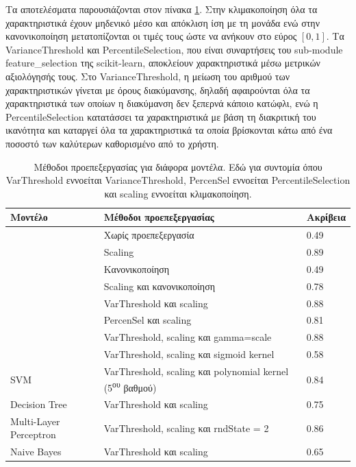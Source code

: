 Τα αποτελέσματα παρουσιάζονται στον πίνακα \ref{table:tab}. Στην κλιμακοποίηση όλα τα χαρακτηριστικά έχουν μηδενικό μέσο και απόκλιση ίση με τη μονάδα ενώ στην κανονικοποίηση μετατοπίζονται οι τιμές τους ώστε να ανήκουν στο εύρος $[0,1]$. Τα VarianceThreshold και PercentileSelection, που είναι συναρτήσεις του sub-module feature\_selection της scikit-learn, αποκλείουν χαρακτηριστικά μέσω μετρικών αξιολόγησής τους. Στο VarianceThreshold, η μείωση του αριθμού των χαρακτηριστικών γίνεται με όρους διακύμανσης, δηλαδή αφαιρούνται όλα τα χαρακτηριστικά των οποίων η διακύμανση δεν ξεπερνά κάποιο κατώφλι, ενώ η PercentileSelection κατατάσσει τα χαρακτηριστικά με βάση τη διακριτική του ικανότητα και καταργεί όλα τα χαρακτηριστικά τα οποία βρίσκονται κάτω από ένα ποσοστό των καλύτερων καθορισμένο από το χρήστη.

\begin{table}[H]
	\centering
	\begin{tabular}{ l l l }
		\textbf{Μοντέλο} & \textbf{Μέθοδοι προεπεξεργασίας} & \textbf{Ακρίβεια} \\ \toprule
		 & Χωρίς προεπεξεργασία & 0.49 \\
		 & Scaling & 0.89 \\
		 & Κανονικοποίηση & 0.49 \\
		 & Scaling και κανονικοποίηση & 0.78 \\
		 & VarThreshold και scaling & 0.88 \\
		 & PercenSel και scaling & 0.81 \\
		 & VarThreshold, scaling και gamma=scale & 0.88 \\
		 & VarThreshold, scaling και sigmoid kernel & 0.58 \\
		\multirow{-9}{*}{SVM} & VarThreshold,  scaling και polynomial kernel (5\textsuperscript{ου} βαθμού) & 0.84 \\ \midrule
		Decision Tree & VarThreshold και scaling & 0.75 \\ \midrule
		Multi-Layer Perceptron & VarThreshold, scaling και rndState = 2 & 0.86 \\ \midrule
		Naive Bayes & VarThreshold και scaling & 0.65 \\ \bottomrule
	\end{tabular}
	\caption{Μέθοδοι προεπεξεργασίας για διάφορα μοντέλα. \small
	Εδώ για συντομία όπου VarThreshold εννοείται VarianceThreshold, PercenSel εννοείται PercentileSelection και scaling εννοείται κλιμακοποίηση.}
	\label{table:tab}
\end{table}

